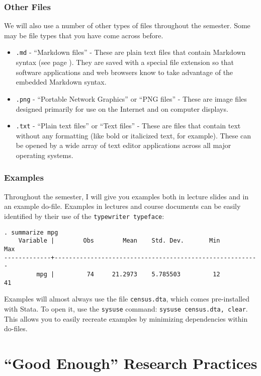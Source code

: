 \documentclass[]{book}
\begin{document}
\subsection{Other Files}\label{other-files}

We will also use a number of other types of files throughout the
semester. Some may be file types that you have come across before.

\begin{itemize}
\item
  \texttt{.md} - ``Markdown files'' - These are plain text files that
  contain Markdown syntax (see page ). They are saved with a special
  file extension so that software applications and web browsers know to
  take advantage of the embedded Markdown syntax.
\item
  \texttt{.png} - ``Portable Network Graphics'' or ``PNG files'' - These
  are image files designed primarily for use on the Internet and on
  computer displays.
\item
  \texttt{.txt} - ``Plain text files'' or ``Text files'' - These are
  files that contain text without any formatting (like bold or
  italicized text, for example). These can be opened by a wide array of
  text editor applications across all major operating systems.
\end{itemize}

\subsection{Examples}\label{examples}

Throughout the semester, I will give you examples both in lecture slides
and in an example do-file. Examples in lectures and course documents can
be easily identified by their use of the \texttt{typewriter\ typeface}:

\begin{verbatim}
. summarize mpg
    Variable |        Obs        Mean    Std. Dev.       Min        Max
-------------+---------------------------------------------------------
         mpg |         74     21.2973    5.785503         12         41
\end{verbatim}

Examples will almost always use the file \texttt{census.dta}, which
comes pre-installed with Stata. To open it, use the \texttt{sysuse}
command: \texttt{sysuse\ census.dta,\ clear}. This allows you to easily
recreate examples by minimizing dependencies within do-files.

\chapter{\texorpdfstring{``Good Enough'' Research
Practices}{Good Enough Research Practices}}\label{good-enough-research-practices}
\end{document}
